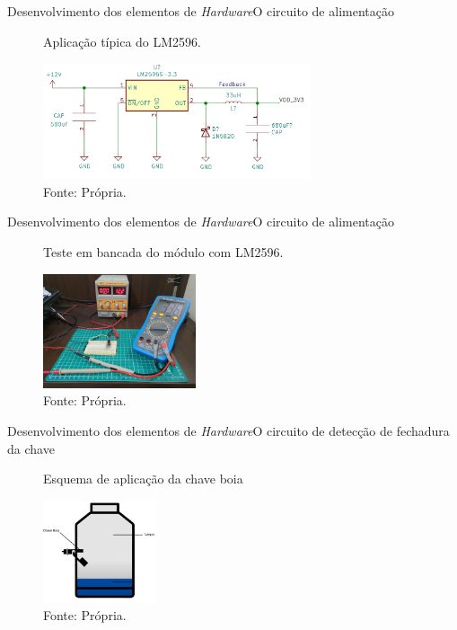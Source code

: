 \begin{frame}{Desenvolvimento dos elementos de \textit{Hardware}}{O circuito de alimentação}
  \begin{figure}[H]
    \centering
    \caption{Aplicação típica do LM2596.}
    \includegraphics[width=0.7\textwidth]{figuras/conversor_buck.jpg}
    \caption*{\tiny{Fonte: Própria.}}
    \label{fig:conversor_buck}
  \end{figure}
\end{frame}

\begin{frame}{Desenvolvimento dos elementos de \textit{Hardware}}{O circuito de alimentação}
  \begin{figure}[H]
    \centering
    \caption{Teste em bancada do módulo com LM2596.}
    \includegraphics[width=0.4\textwidth]{figuras/conversor_buck_teste.jpg}
    \caption*{\tiny{Fonte: Própria.}}
    \label{fig:conversor_buck_teste}
  \end{figure}
\end{frame}

\begin{frame}{Desenvolvimento dos elementos de \textit{Hardware}}{O circuito de detecção de fechadura da chave}
  \begin{figure}[H]
    \centering
    \caption{Esquema de aplicação da chave boia}
    \includegraphics[width=0.3\textwidth]{figuras/chave_boia_aplicacao.png}
    \caption*{\tiny{Fonte: Própria.}}
    \label{fig:chave_boia_aplicacao}
  \end{figure}
\end{frame}

